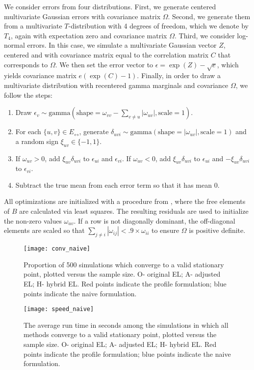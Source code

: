 \documentclass[notitlepage]{article}
\begin{document}
We consider errors from four distributions.  First, we generate
centered multivariate Gaussian errors with covariance matrix $\Omega$.
Second, we generate them from a multivariate $T$-distribution with 4
degrees of freedom, which we denote by $T_4$, again with expectation
zero and covariance matrix $\Omega$.  Third, we consider log-normal
errors.  In this case, we simulate a multivariate Gaussian vector $Z$,
centered and with covariance matrix equal to the correlation matrix
$C$ that corresponds to $\Omega$. We then set the error vector to
$\epsilon = \exp(Z) - \sqrt{e}$, which yields covariance matrix
$e(\exp(C) - 1)$.  Finally, in order to draw a multivariate
distribution with recentered gamma marginals and covariance $\Omega$,
we follow the steps:
\begin{enumerate}
\item Draw $\epsilon_v \sim \text{gamma}(\text{shape} = \omega_{vv} - \sum_{v \neq u} |\omega_{uv}|, \text{scale} = 1)$.
\item For each $\{u,v\}\in E_\leftrightarrow$, generate $\delta_{uvi}
  \sim \text{gamma}(\text{shape} = |\omega_{uv}|, \text{scale} = 1)$
  and a random sign $\xi_{uv}\in\{-1, 1\}$.
\item If $\omega_{uv} > 0$, add $\xi_{uv} \delta_{uvi}$ to
  $\epsilon_{ui}$ and $\epsilon_{vi}$.  If $\omega_{uv} < 0$, add
  $\xi_{uv} \delta_{uvi}$ to $\epsilon_{ui}$ and
  $-\xi_{uv} \delta_{uvi}$ to $\epsilon_{vi}$.
\item Subtract the true mean from each error term so that it has mean 0.
\end{enumerate}
All optimizations are initialized with a procedure from
\citet{drton2016computation}, where the free elements of $B$ are
calculated via least squares.  The resulting residuals are used to
initialize the non-zero values $\omega_{uv}$.  If a row is not
diagonally dominant, the off-diagonal elements are scaled so that
$\sum_{j\neq i} |\omega_{ij}| <.9 \times \omega_{ii}$ to ensure $\Omega$
is positive definite.

\begin{figure}
  \centering
  \texttt{[image: conv\_naive]}
  \caption{\label{fig:naiveProfConv}Proportion of 500 simulations
    which converge to a valid stationary point, plotted versus the
    sample size. O- original EL; A- adjusted EL; H- hybrid EL. Red
    points indicate the profile formulation; blue points indicate the
    naive formulation.}
\end{figure}

  \begin{figure}
    \centering
  \texttt{[image: speed\_naive]}
  \caption{\label{fig:naiveProfTime}The average run time in seconds among the simulations in which all methods converge to a valid stationary point, plotted versus the
    sample size. O- original EL; A- adjusted EL; H- hybrid EL. Red points indicate the profile formulation; blue points indicate the naive formulation.}
\end{figure}
\end{document}
